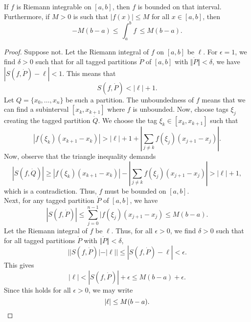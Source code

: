 \documentclass[11pt]{article}
\theoremstyle{definition}
\theoremstyle{remark}
\numberwithin{equation}{module}
\begin{document}
    \begin{theorem}\label{th:bounded}
        If $f$ is Riemann integrable on $[a, b]$, then $f$ is bounded on that interval.
        Furthermore, if $M > 0$ is such that $|f(x)| \leq M$ for all $x \in [a, b]$,
        then \[
            -M(b - a) \leq\, \int_a^b f \,\leq M(b - a).
        \] 
    \end{theorem}
    \begin{proof}
        Suppose not. Let the Riemann integral of $f$ on $[a, b]$ be $\ell$. For
        $\epsilon = 1$, we find $\delta > 0$ such that for all tagged partitions
        $\dot{P}$ of $[a, b]$ with $\Vert\dot{P}\Vert < \delta$, we have $|S(f,
        \dot{P}) - \ell| < 1$. This means that \[
            S(f, \dot{P}) < |\ell| + 1.
        \] Let $Q = \{x_0, \dots, x_n\}$ be such a partition. The unboundedness of
        $f$ means that we can find a subinterval $[x_k, x_{k + 1}]$ where $f$ is
        unbounded. Now, choose tags $\xi_j$ creating the tagged partition $\dot{Q}$.
        We choose the tag $\xi_k \in [x_k, x_{k + 1}]$ such
        that \[
            |f(\xi_k)(x_{k + 1} - x_k)| > |\ell| + 1 + |\sum_{j \neq k}
            f(\xi_j)(x_{j + 1} - x_j)|.
        \] Now, observe that the triangle inequality demands \[
            |S(f, \dot{Q})| \geq |f(\xi_{k})(x_{k + 1} - x_k)| - |\sum_{j \neq k}
            f(\xi_j)(x_{j + 1} - x_j)| > |\ell| + 1,
        \] which is a contradiction. Thus, $f$ must be bounded on $[a, b]$. \\
        
        \noindent
        Next, for any tagged partition $\dot{P}$ of $[a, b]$, we have \[
            |S(f, \dot{P})| \leq \sum_{j = 0}^{n - 1}|f(\xi_j)(x_{j + 1} - x_j) \leq
            M(b - a).
        \] Let the Riemann integral of $f$ be $\ell$.
        Thus, for all $\epsilon > 0$, we find $\delta > 0$ such that for all
        tagged partitions $\dot{P}$ with $\Vert\dot{P}\Vert < \delta$, \[
            | |S(f, \dot{P})| - |\ell| | \leq |S(f, \dot{P}) - \ell| < \epsilon.
        \] This gives \[
            |\ell| < |S(f, \dot{P})| + \epsilon \leq M(b - a) + \epsilon.
        \] Since this holds for all $\epsilon > 0$, we may write \[
            |\ell| \leq M(b - a). \qedhere
        \] 
    \end{proof}
\end{document}
